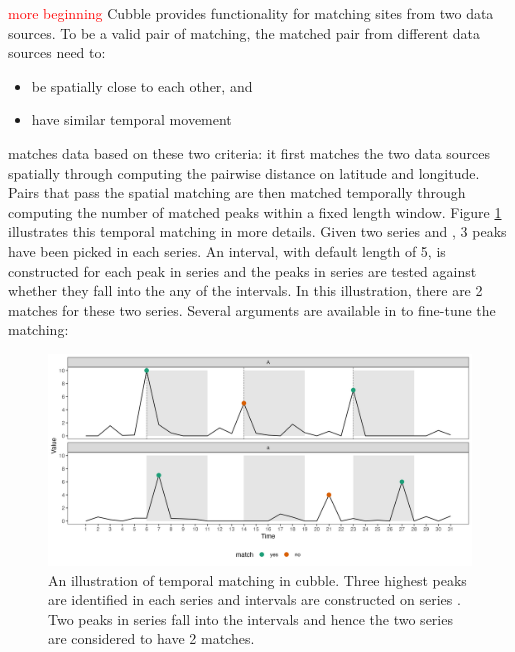 \documentclass[
]{jss}
\providecommand{\tightlist}{%
  \setlength{\itemsep}{0pt}\setlength{\parskip}{0pt}}
\begin{document}
\textcolor{red}{more beginning} Cubble provides functionality for
matching sites from two data sources. To be a valid pair of matching,
the matched pair from different data sources need to:

\begin{itemize}
\tightlist
\item
  be spatially close to each other, and
\item
  have similar temporal movement
\end{itemize}

 matches data based on these two criteria: it first
matches the two data sources spatially through computing the pairwise
distance on latitude and longitude. Pairs that pass the spatial matching
are then matched temporally through computing the number of matched
peaks within a fixed length window. Figure \ref{fig:illu-matching}
illustrates this temporal matching in more details. Given two series
 and , 3 peaks have been picked in each series. An
interval, with default length of 5, is constructed for each peak in
series  and the peaks in series  are tested against
whether they fall into the any of the intervals. In this illustration,
there are 2 matches for these two series. Several arguments are
available in  to fine-tune the matching:

\begin{CodeChunk}
\begin{figure}

{\centering \includegraphics[width=1\linewidth]{figures/illu-matching} 

}

\caption{An illustration of temporal matching in cubble. Three highest peaks are identified in each series and intervals are constructed on series . Two peaks in series  fall into the intervals and hence the two series are considered to have 2 matches.}\label{fig:illu-matching}
\end{figure}
\end{CodeChunk}
\end{document}
